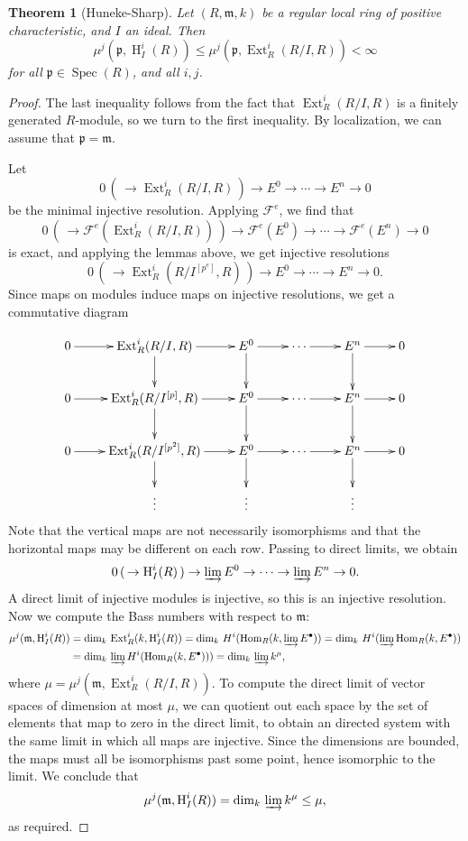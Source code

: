 \documentclass[11pt]{book}
\newtheorem{theorem}{Theorem}[chapter]
\numberwithin{equation}{section}
\numberwithin{theorem}{chapter}
\theoremstyle{definition}
\newtheorem*{basic properties}{Basic Properties}
\newtheorem*{Important Remark}{Important Remark}
\theoremstyle{remark}
\newcommand{\m}{\mathfrak{m}}
\newcommand{\p}{\mathfrak{p}}
\newcommand{\cF}{\mathcal{F}}
\newcommand{\Spec}{\operatorname{Spec}}
\newcommand{\Hom}{\operatorname{Hom}}
\newcommand{\Ext}{\operatorname{Ext}}
\renewcommand{\dim}{\operatorname{dim}}
\renewcommand{\H}{\operatorname{H}}
\begin{document}
\begin{theorem}[Huneke-Sharp]
	Let $(R,\m,k)$ be a regular local ring of positive characteristic, and $I$ an ideal. Then
	\[ \mu^j(\p,\H^i_I(R)) \leq \mu^j(\p, \Ext^i_R(R/I,R))<\infty \]
	for all $\p\in\Spec(R)$, and all $i,j$. 
	\end{theorem}
\begin{proof}
	The last inequality follows from the fact that $\Ext^i_R(R/I,R)$ is a finitely generated $R$-module, so we turn to the first inequality. By localization, we can assume that $\p=\m$.
	
	Let \[0 \,(\,\to \Ext^i_R(R/I,R)\,) \to E^0 \to \cdots \to E^n \to 0\] be the minimal injective resolution. Applying $\cF^e$, we find that
	\[ 0 \,(\,\to \cF^e(\Ext^i_R(R/I,R))\,) \to \cF^e(E^0) \to \cdots \to \cF^e(E^n) \to 0\] is exact, and applying the lemmas above, we get injective resolutions
		\[ 0 \,(\, \to \Ext^i_R(R/I^{[p^e]},R)\,) \to E^0 \to \cdots \to E^n \to 0.\]
		Since maps on modules induce maps on injective resolutions, we get a commutative diagram
		
		\[ \xymatrix{ 0 \ar[r] &  \Ext^i_R(R/I,R) \ar[r]\ar[d] & E^0 \ar[r]\ar[d] & \cdots\ar[r] & E^n \ar[r]\ar[d] & 0 \\
		0 \ar[r] &  \Ext^i_R(R/I^{[p]},R) \ar[r]\ar[d] & E^0 \ar[r]\ar[d] & \cdots\ar[r] & E^n \ar[r]\ar[d] & 0 \\ 
	0 \ar[r] &  \Ext^i_R(R/I^{[p^2]},R) \ar[r]\ar[d] & E^0 \ar[r]\ar[d] & \cdots\ar[r] & E^n \ar[r]\ar[d] & 0 \\
& \vdots & \vdots & & \vdots & }\]
Note that the vertical maps are not necessarily isomorphisms and that the horizontal maps may be different on each row. Passing to direct limits, we obtain
\[ 0 \,(\, \to \H^i_I(R) \,) \to \varinjlim E^0 \to \cdots \to \varinjlim E^n \to 0.\]
A direct limit of injective modules is injective, so this is an injective resolution. Now we compute the Bass numbers with respect to $\m$:
\begin{align*} \mu^j(\m,\H^i_I(R)) &= \dim_k \, \Ext^i_R(k,\H^i_I(R)) = \dim_k \, H^i(\Hom_R(k,\varinjlim E^{\bullet})) = \dim_k \, H^i(\varinjlim \Hom_R(k, E^{\bullet})) \\ &= \dim_k \, \varinjlim H^i(\Hom_R(k, E^{\bullet})) ) = \dim_k \, \varinjlim k^{\mu}, \end{align*}
where $\mu=\mu^j(\m,\Ext^i_R(R/I,R))$. To compute the direct limit of vector spaces of dimension at most $\mu$, we can quotient out each space by the set of elements that map to zero in the direct limit, to obtain an directed system with the same limit in which all maps are injective. Since the dimensions are bounded, the maps must all be isomorphisms past some point, hence isomorphic to the limit. We conclude that 
\[ \mu^j(\m,\H^i_I(R)) = \dim_k \, \varinjlim k^{\mu} \leq \mu, \]
as required.
\end{proof}
\end{document}
